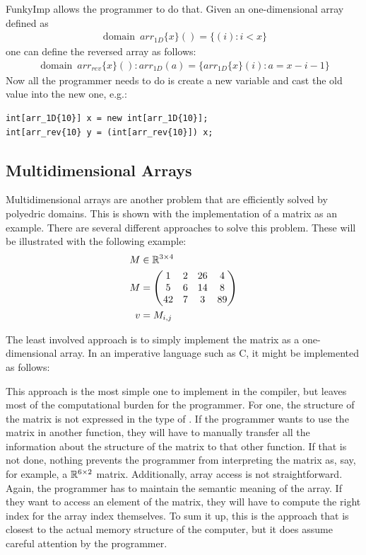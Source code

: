 FunkyImp allows the programmer to do that. Given an one-dimensional array defined as 
\begin{gather*}
	\operatorname{domain} \ arr_{1D}\{x\}() = \{(i) : i < x\}
\end{gather*}
one can define the reversed array as follows:
\begin{gather*}
	\operatorname{domain} \ arr_{rev}\{x\}() : arr_{1D}(a) = \{arr_{1D}\{x\}(i) : a = x-i-1\}
\end{gather*}
Now all the programmer needs to do is create a new variable and cast the old value into the new one, e.g.:
\begin{verbatim}
int[arr_1D{10}] x = new int[arr_1D{10}];
int[arr_rev{10} y = (int[arr_rev{10}]) x;
\end{verbatim}

\subsection{Multidimensional Arrays}
\label{sect:theory_funky_multidim}

Multidimensional arrays are another problem that are efficiently solved by polyedric domains. This is shown with the implementation of a matrix as an example. There are several different approaches to solve this problem. These will be illustrated with the following example:
\begin{align*}
	M &\in \mathbb{R}^{3\times4} \\
	M &= \begin{pmatrix}
			1 & 2 & 26 & 4 \\
			5 & 6 & 14 & 8 \\
			42 & 7 & 3 & 89
		\end{pmatrix}\\
	v &= M_{i,j}
\end{align*}

The least involved approach is to simply implement the matrix as a one-dimensional array. In an imperative language such as C, it might be implemented as follows:



This approach is the most simple one to implement in the compiler, but leaves most of the computational burden for the programmer. For one, the structure of the matrix is not expressed in the type of . If the programmer wants to use the matrix in another function, they will have to manually transfer all the information about the structure of the matrix to that other function. If that is not done, nothing prevents the programmer from interpreting the matrix as, say, for example, a $\mathbb{R}^{6\times2}$ matrix. Additionally, array access is not straightforward. Again, the programmer has to maintain the semantic meaning of the array. If they want to access an element of the matrix, they will have to compute the right index for the array index themselves. To sum it up, this is the approach that is closest to the actual memory structure of the computer, but it does assume careful attention by the programmer. \\


